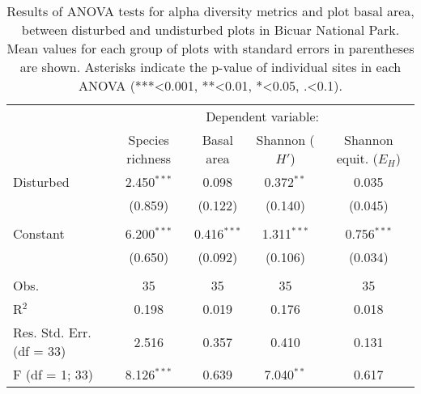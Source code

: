 
\begin{table}[!htbp] \centering 
  \caption[ANOVA statistics among disturbed and undisturbed plots in Bicuar National Park]{Results of ANOVA tests for alpha diversity metrics and plot basal area, between disturbed and undisturbed plots in Bicuar National Park. Mean values for each group of plots with standard errors in parentheses are shown. Asterisks indicate the p-value of individual sites in each ANOVA (***<0.001, **<0.01, *<0.05, .<0.1).} 
  \label{bicuar:degrad_anova_table} 
\begin{tabular}{lcccc} 
\hline
 & \multicolumn{4}{c}{Dependent variable:} \\ 
\cline{2-5} 
& Species richness & Basal area & Shannon ($H'$) & Shannon equit. ($E_{H}$) \\ 
\hline
 Disturbed & 2.450$^{***}$ & 0.098 & 0.372$^{**}$ & 0.035 \\ 
  & (0.859) & (0.122) & (0.140) & (0.045) \\ 
  & & & & \\ 
 Constant & 6.200$^{***}$ & 0.416$^{***}$ & 1.311$^{***}$ & 0.756$^{***}$ \\ 
  & (0.650) & (0.092) & (0.106) & (0.034) \\ 
  & & & & \\ 
\hline
Obs. & 35 & 35 & 35 & 35 \\ 
R$^{2}$ & 0.198 & 0.019 & 0.176 & 0.018 \\ 
Res. Std. Err. (df = 33) & 2.516 & 0.357 & 0.410 & 0.131 \\ 
F (df = 1; 33) & 8.126$^{***}$ & 0.639 & 7.040$^{**}$ & 0.617 \\ 
\hline 
\end{tabular} 
\end{table} 
